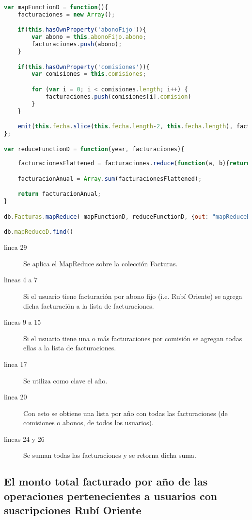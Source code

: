 \begin{lstlisting}[language=JavaScript]
var mapFunctionD = function(){
	facturaciones = new Array();

	if(this.hasOwnProperty('abonoFijo')){
		var abono = this.abonoFijo.abono;
		facturaciones.push(abono);
	}

	if(this.hasOwnProperty('comisiones')){
		var comisiones = this.comisiones;

		for (var i = 0; i < comisiones.length; i++) {
			facturaciones.push(comisiones[i].comision)
		}
	}

	emit(this.fecha.slice(this.fecha.length-2, this.fecha.length), facturaciones)
};

var reduceFunctionD = function(year, facturaciones){
	
	facturacionesFlattened = facturaciones.reduce(function(a, b){return a.concat(b)}, []);

	facturacionAnual = Array.sum(facturacionesFlattened);

	return facturacionAnual;
}

db.Facturas.mapReduce( mapFunctionD, reduceFunctionD, {out: "mapReduceD"} )

db.mapReduceD.find()
\end{lstlisting}

\begin{description}
 \item[linea 29] Se aplica el MapReduce sobre la colección Facturas.
 \item[lineas 4 a 7] Si el usuario tiene facturación por abono fijo (i.e. Rubí Oriente) se agrega dicha facturación a la lista de facturaciones.
 \item[lineas 9 a 15] Si el usuario tiene una o más facturaciones por comisión se agregan todas ellas a la lista de facturaciones.
 \item[linea 17] Se utiliza como clave el año.
 \item[linea 20] Con esto se obtiene una lista por año con todas las facturaciones (de comisiones o abonos, de todos los usuarios).
 \item[lineas 24 y 26] Se suman todas las facturaciones y se retorna dicha suma.
\end{description}

\newpage
\subsection{El monto total facturado por año de las operaciones pertenecientes a usuarios con suscripciones Rubí Oriente}


